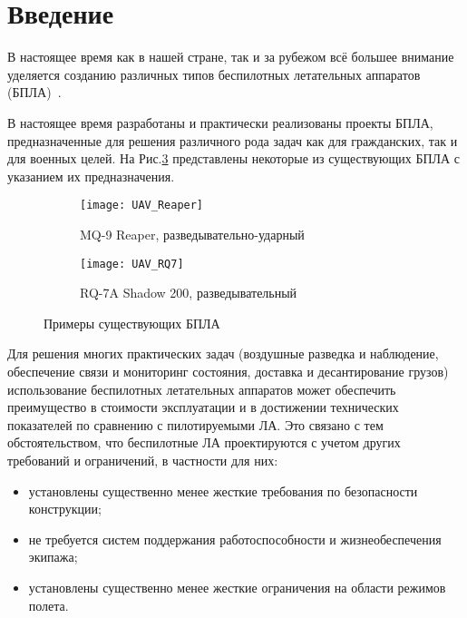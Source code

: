 \chapter*{Введение}

В настоящее время как в нашей стране, так и за рубежом всё большее внимание уделяется созданию различных типов беспилотных летательных аппаратов (БПЛА)~\cite{UAVBook}. 


В настоящее время разработаны и практически реализованы проекты БПЛА, предназначенные для решения различного рода задач как для гражданских, так и для военных целей. На Рис.\ref{fig:UAVs} представлены некоторые из существующих БПЛА с указанием их предназначения.


\begin{figure}[H]
        \begin{subfigure}[b]{0.47\textwidth}
                \texttt{[image: UAV\_Reaper]}
                \caption{MQ-9 Reaper, разведывательно-ударный} %
                \label{fig:UAV_Reaper}
        \end{subfigure}%
        \hspace{\fill}
        \begin{subfigure}[b]{0.47\textwidth}
                \texttt{[image: UAV\_RQ7]}
                \caption{RQ-7A Shadow 200, разведывательный}
                \label{fig:UAV_RQ7}
        \end{subfigure}
        \caption{Примеры существующих БПЛА}\label{fig:UAVs}
\end{figure}

Для решения многих практических задач (воздушные разведка и наблюдение, обеспечение связи и мониторинг состояния, доставка и десантирование грузов) использование беспилотных летательных аппаратов может обеспечить преимущество в стоимости эксплуатации и в достижении технических показателей по сравнению с пилотируемыми ЛА. Это связано с тем обстоятельством, что беспилотные ЛА проектируются с учетом других требований и ограничений, в частности для них:

\begin{itemize}
\item установлены существенно менее жесткие требования по безопасности конструкции;
\item не требуется систем поддержания работоспособности и жизнеобеспечения экипажа;
\item установлены существенно менее жесткие ограничения на области режимов полета.
\end{itemize} 

